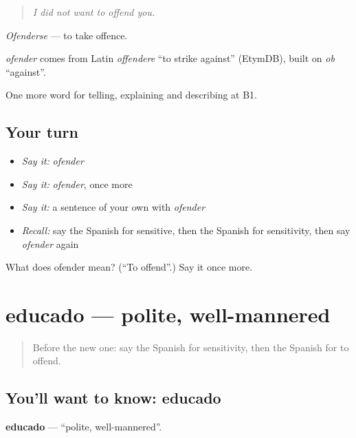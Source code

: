 \begin{quote}
\emph{I did not want to offend you.}
\end{quote}

\emph{Ofenderse} — to take offence.

\begin{cousinweb}
\emph{ofender} comes from Latin \emph{offendere} \textquotedblleft{}to strike against\textquotedblright{} (EtymDB), built on \emph{ob} \textquotedblleft{}against\textquotedblright{}.
\end{cousinweb}

\begin{grammarlens}[title={What you've built}]
One more word for telling, explaining and describing at B1.
\end{grammarlens}

\subsection*{Your turn}
\begin{itemize}
\raggedright
  \item \emph{Say it:} \emph{ofender}
  \item \emph{Say it:} \emph{ofender}, once more
  \item \emph{Say it:} a sentence of your own with \emph{ofender}
  \item \emph{Recall:} say the Spanish for sensitive, then the Spanish for sensitivity, then say \emph{ofender} again
\end{itemize}

\begin{tcolorbox}[breakable,colback=teal!4,colframe=teal!35!black,title={Before you move on}]
What does ofender mean? (\textquotedblleft{}To offend\textquotedblright{}.) Say it once more.
\end{tcolorbox}
\section[educado]{educado — polite, well-mannered}

\label{lesson:ES-C727-educado}



\begin{quote}
Before the new one: say the Spanish for sensitivity, then the Spanish for to offend.
\end{quote}

\subsection*{You'll want to know: educado}
\textbf{educado} — \textquotedblleft{}polite, well-mannered\textquotedblright{}.

